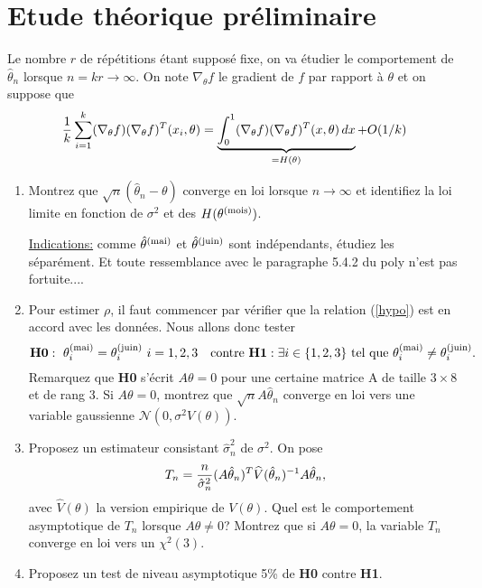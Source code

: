 \documentclass{article}
\newcommand{\mois}{\textrm{\scriptsize mois}}
\newcommand{\mai}{\textrm{\scriptsize mai}}
\newcommand{\juin}{\textrm{\scriptsize juin}}
\begin{document}
\section{Etude th\'eorique pr\'eliminaire}
Le nombre $r$ de r\'ep\'etitions  \'etant suppos\'e fixe, on va \'etudier le comportement de $\hat \theta_{n}$ lorsque $n=kr\to \infty$.
On note $\nabla_{\theta} f$ le gradient de $f$ par rapport \`a $\theta$ et on  suppose que
$$ {1\over k}\sum_{i=1}^k(\nabla_{\theta} f)(\nabla_{\theta} f)^{T}(x_{i},\theta)= \underbrace{\int_{0}^1(\nabla_{\theta} f)(\nabla_{\theta} f)^{T}(x,\theta)\,dx}_{=H(\theta)}+O(1/k)$$ 
\begin{enumerate}
\item Montrez que $\sqrt{n}(\hat\theta_{n}-\theta)$ converge en loi lorsque $n\to \infty$ et identifiez la loi limite en fonction de $\sigma^2$ et des $H(\theta^{(\mois)})$. \smallskip

\begin{small}
\underline{Indications:} comme $\hat \theta^{(\mai)}$ et $\hat \theta^{(\juin)}$ sont ind\'ependants, \'etudiez les s\'epar\'ement. Et toute ressemblance avec le paragraphe 5.4.2 du poly n'est pas fortuite....
\end{small}  \smallskip

\item Pour estimer $\rho$, il faut commencer par v\'erifier que la relation (\ref{hypo}) est en accord avec les donn\'ees. Nous allons donc tester 
$${\bf H0}:\ \theta_{i}^{(\mai)}=\theta_{i}^{(\juin)}\ i=1,2,3\quad \textrm{contre} \ {\bf H1}: \exists i\in\{1,2,3\} \ \textrm{tel que}\  \theta_{i}^{(\mai)}\neq\theta_{i}^{(\juin)}.$$
Remarquez que {\bf H0} s'\'ecrit $A\theta=0$ pour une certaine matrice A de taille $3\times 8$ et de rang 3. Si $A\theta=0$, montrez que $\sqrt{n}A\hat\theta_{n}$ converge en loi vers une variable gaussienne $\mathcal{N}(0,\sigma^2V(\theta))$.
\item Proposez un estimateur consistant $\hat \sigma^2_{n}$ de $\sigma^2$. On pose 
$$T_{n}={n\over \hat\sigma^2_{n}} (A\hat\theta_{n})^{T}\widehat V(\hat\theta_{n})^{-1}A\hat\theta_{n},$$
avec $\widehat V(\theta)$ la version empirique de $V(\theta)$.
Quel est le comportement asymptotique de $T_{n}$ lorsque $A\theta\neq 0$? Montrez que si $A\theta=0$, la variable $T_{n}$ converge en loi vers un $\chi^2(3)$.
\item Proposez un test de niveau asymptotique 5\% de {\bf H0} contre {\bf H1}.
\end{enumerate}
\end{document}
